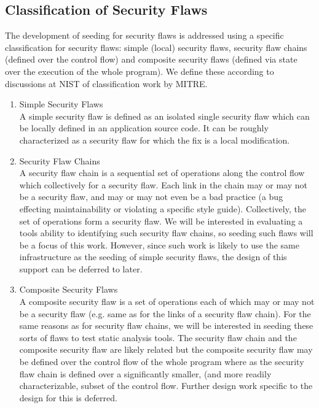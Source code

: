 \subsection{Classification of Security Flaws}
         The development of seeding for security flaws is addressed using a specific 
         classification for security flaws: simple (local) security flaws, 
         security flaw chains (defined over the control flow) and composite security flaws
         (defined via state over the execution of the whole program).
         We define these according to discussions at NIST of classification work by MITRE.
      \begin{enumerate}
         \item Simple Security Flaws \\ 
               A simple security flaw is defined as an isolated single security flaw
               which can be locally defined in an application source code. It can be
               roughly characterized as a security flaw for which the fix is a local 
               modification.

         \item Security Flaw Chains \\ 
               A security flaw chain is a sequential set of operations along the control
               flow which collectively for a security flaw.  Each link in the chain may or
               may not be a security flaw, and may or may not even be a bad practice (a
               bug effecting maintainability or violating a specific style guide).
               Collectively, the set of operations form a security flaw.  We will be
               interested in evaluating a tools ability to identifying such security flaw 
               chains, so seeding such flaws will be a focus of this work. However,
               since such work is likely to use the same infrastructure as the 
               seeding of simple security flaws, the design of this support can be
               deferred to later.

         \item Composite Security Flaws \\
               A composite security flaw is a set of operations each of which may or 
               may not be a security flaw (e.g. same as for the links of a security flaw
               chain).  For the same reasons as for security flaw chains, we will be
               interested in seeding these sorts of flaws to test static analysis tools.
               The security flaw chain and the composite security flaw are likely related
               but the composite security flaw may be defined over the control flow of the
               whole program where as the security flaw chain is defined over a
               significantly smaller, (and more readily characterizable, subset of the
               control flow. Further design work specific to the design for this is
               deferred.
      \end{enumerate}

